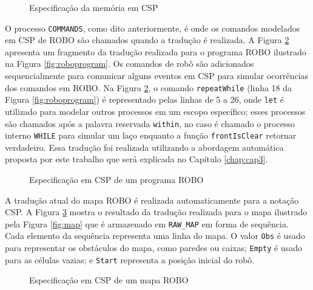 \begin{figure}[h]
\caption{Especificação da memória em CSP}

\label{fig:model}
\end{figure}
O processo \texttt{COMMANDS}, como dito anteriormente, é onde os comandos modelados em CSP de ROBO são chamados quando a tradução é realizada. A Figura \ref{fig:programcsp} apresenta um fragmento da tradução realizada para o programa ROBO ilustrado na Figura \ref{fig:roboprogram}. Os comandos de robô são adicionados sequencialmente para comunicar alguns eventos em CSP para simular ocorrências dos comandos em ROBO. Na Figura \ref{fig:programcsp}, o comando \texttt{repeatWhile} (linha 18 da Figura \ref{fig:roboprogram}) é representado pelas linhas de 5 a 26, onde \texttt{let} é utilizado para modelar outros processos em um escopo específico; esses processos são chamados após a palavra reservada \texttt{within}, no caso é chamado o processo interno \texttt{WHILE} para simular um laço enquanto a função \texttt{frontIsClear} retornar verdadeiro. Essa tradução foi realizada utilizando a abordagem automática proposta por este trabalho que será explicada no Capítulo \ref{chap:cap3}.

\begin{figure}[h]
\caption{Especificação em CSP de um programa ROBO}

\label{fig:programcsp}
\end{figure}


A tradução atual do mapa ROBO é realizada automaticamente para a notação CSP. A Figura \ref{fig:mapcsp} mostra o resultado da tradução realizada para o mapa ilustrado pela Figura \ref{fig:map} que é armazenado em \texttt{RAW\_MAP} em forma de sequência. Cada elemento da sequência representa uma linha do mapa. O valor \texttt{Obs} é usado para representar os obstáculos do mapa, como paredes ou caixas; \texttt{Empty} é usado para as células vazias; e \texttt{Start} representa a posição inicial do robô.

\begin{figure}[h]
\caption{Especificação em CSP de um mapa ROBO}

\label{fig:mapcsp}
\end{figure}

